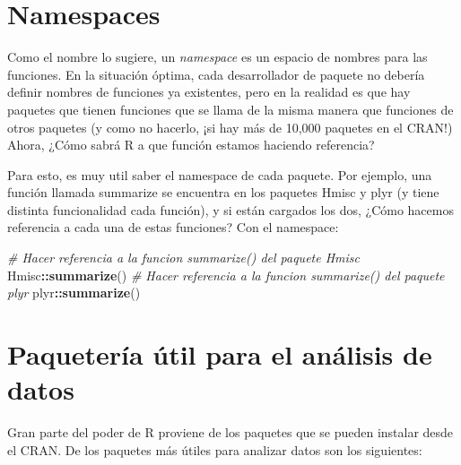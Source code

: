 \documentclass[]{book}
\newenvironment{Shaded}{\begin{snugshade}}{\end{snugshade}}
\newcommand{\CommentTok}[1]{\textcolor[rgb]{0.56,0.35,0.01}{\textit{#1}}}
\newcommand{\KeywordTok}[1]{\textcolor[rgb]{0.13,0.29,0.53}{\textbf{#1}}}
\newcommand{\NormalTok}[1]{#1}
\newcommand{\OperatorTok}[1]{\textcolor[rgb]{0.81,0.36,0.00}{\textbf{#1}}}
\begin{document}
\hypertarget{namespaces}{%
\section{Namespaces}\label{namespaces}}

Como el nombre lo sugiere, un \emph{namespace} es un espacio de nombres para las funciones. En la situación óptima, cada desarrollador de paquete no debería definir nombres de funciones ya existentes, pero en la realidad es que hay paquetes que tienen funciones que se llama de la misma manera que funciones de otros paquetes (y como no hacerlo, ¡si hay más de 10,000 paquetes en el CRAN!) Ahora, ¿Cómo sabrá R a que función estamos haciendo referencia?

Para esto, es muy util saber el namespace de cada paquete. Por ejemplo, una función llamada summarize se encuentra en los paquetes Hmisc y plyr (y tiene distinta funcionalidad cada función), y si están cargados los dos, ¿Cómo hacemos referencia a cada una de estas funciones? Con el namespace:

\begin{Shaded}
\begin{Highlighting}[]
\CommentTok{# Hacer referencia a la funcion summarize() del paquete Hmisc}
\NormalTok{Hmisc}\OperatorTok{::}\KeywordTok{summarize}\NormalTok{()}
\CommentTok{# Hacer referencia a la funcion summarize() del paquete plyr}
\NormalTok{plyr}\OperatorTok{::}\KeywordTok{summarize}\NormalTok{()}
\end{Highlighting}
\end{Shaded}

\hypertarget{paqueteruxeda-uxfatil-para-el-anuxe1lisis-de-datos}{%
\section{Paquetería útil para el análisis de datos}\label{paqueteruxeda-uxfatil-para-el-anuxe1lisis-de-datos}}

Gran parte del poder de R proviene de los paquetes que se pueden instalar desde el CRAN. De los paquetes más útiles para analizar datos son los siguientes:
\end{document}
